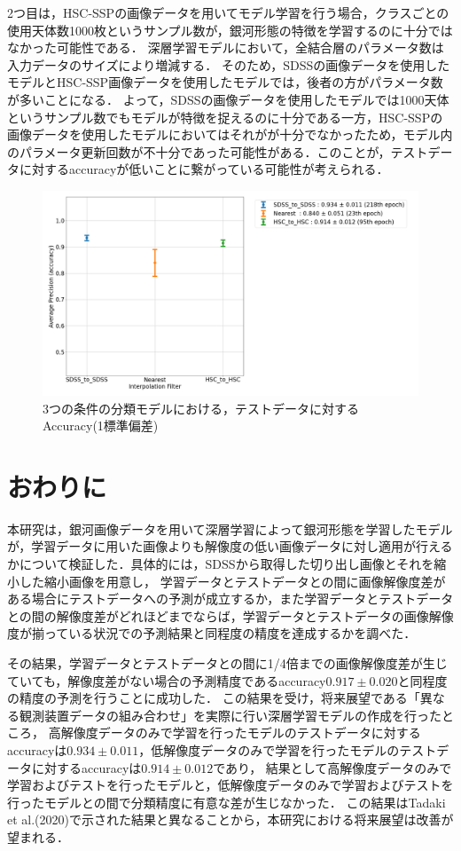 \documentclass[a4j, 11pt]{jreport}
\begin{document}
2つ目は，HSC-SSPの画像データを用いてモデル学習を行う場合，クラスごとの使用天体数1000枚というサンプル数が，銀河形態の特徴を学習するのに十分ではなかった可能性である．
深層学習モデルにおいて，全結合層のパラメータ数は入力データのサイズにより増減する．
そのため，SDSSの画像データを使用したモデルとHSC-SSP画像データを使用したモデルでは，後者の方がパラメータ数が多いことになる．
よって，SDSSの画像データを使用したモデルでは1000天体というサンプル数でもモデルが特徴を捉えるのに十分である一方，HSC-SSPの画像データを使用したモデルにおいてはそれがが十分でなかったため，モデル内のパラメータ更新回数が不十分であった可能性がある．このことが，テストデータに対するaccuracyが低いことに繋がっている可能性が考えられる．

\begin{figure}[H]
  \centering
  \includegraphics[width=1.0\hsize, keepaspectratio]{images/6syou/acc_with_errorbar_auto_epoch.png}
  \caption{3つの条件の分類モデルにおける，テストデータに対するAccuracy(1標準偏差)}
  \label{fig:6syou_zikkenn}
\end{figure}


\newpage
\chapter{おわりに}
本研究は，銀河画像データを用いて深層学習によって銀河形態を学習したモデルが，学習データに用いた画像よりも解像度の低い画像データに対し適用が行えるかについて検証した．具体的には，SDSSから取得した切り出し画像とそれを縮小した縮小画像を用意し，
学習データとテストデータとの間に画像解像度差がある場合にテストデータへの予測が成立するか，また学習データとテストデータとの間の解像度差がどれほどまでならば，学習データとテストデータの画像解像度が揃っている状況での予測結果と同程度の精度を達成するかを調べた．


その結果，学習データとテストデータとの間に1/4倍までの画像解像度差が生じていても，解像度差がない場合の予測精度であるaccuracy$0.917 \pm 0.020$と同程度の精度の予測を行うことに成功した．
この結果を受け，将来展望である「異なる観測装置データの組み合わせ」を実際に行い深層学習モデルの作成を行ったところ，
高解像度データのみで学習を行ったモデルのテストデータに対するaccuracyは$0.934 \pm 0.011$，低解像度データのみで学習を行ったモデルのテストデータに対するaccuracyは$0.914 \pm 0.012$であり，
結果として高解像度データのみで学習およびテストを行ったモデルと，低解像度データのみで学習およびテストを行ったモデルとの間で分類精度に有意な差が生じなかった．
この結果はTadaki et al.(2020)で示された結果と異なることから，本研究における将来展望は改善が望まれる．
\end{document}
